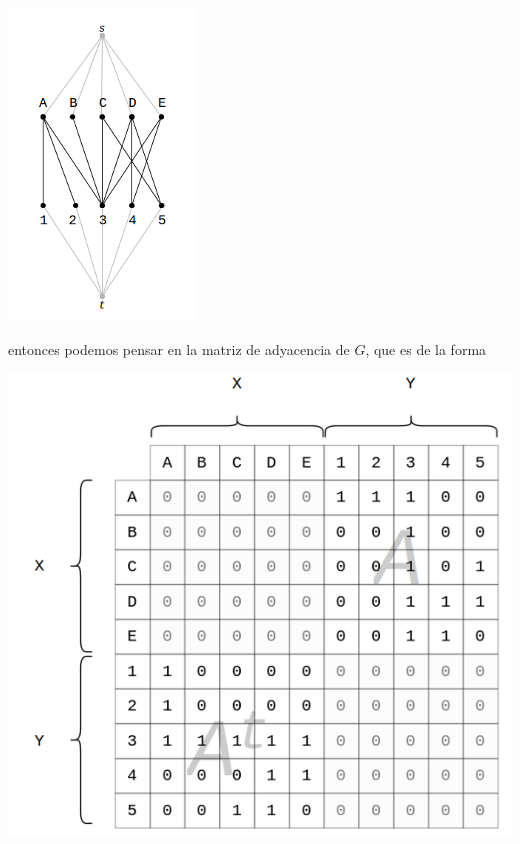 \documentclass[10pt,a4paper]{article}
\begin{document}
\begin{center}

    \begin{adjustbox}{max size={\textwidth}{\textheight}}
        \includegraphics{definitions/matching_4.jpg}
        \end{adjustbox}
    
\end{center}

entonces podemos pensar en la matriz de adyacencia de $G$, que es de la forma

\begin{center}

    \begin{adjustbox}{max size={\textwidth}{\textheight}}
        \includegraphics{definitions/matching_5.jpg}
        \end{adjustbox}
    
\end{center}
\end{document}
